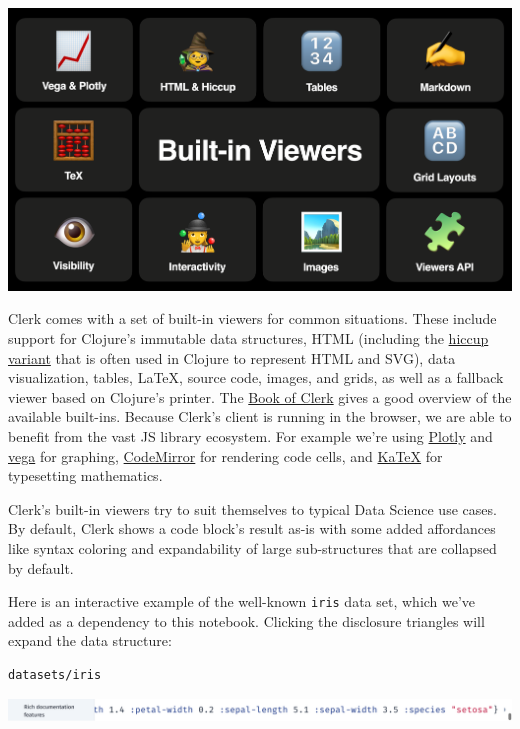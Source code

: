 \documentclass[sigconf,screen]{acmart}
\newcommand{\passthrough}[1]{#1}
\begin{document}
\includegraphics{images/built-in-viewers.png}

Clerk comes with a set of built-in viewers for common situations. These include support for Clojure's immutable data structures, HTML (including the \href{https://github.com/weavejester/hiccup}{hiccup variant} that is often used in Clojure to represent HTML and SVG), data visualization, tables, LaTeX, source code, images, and grids, as well as a fallback viewer based on Clojure's printer. The \href{https://book.clerk.vision}{Book of Clerk} gives a good overview of the available built-ins. Because Clerk's client is running in the browser, we are able to benefit from the vast JS library ecosystem. For example we're using \href{https://plotly.com/javascript/}{Plotly} and \href{https://github.com/vega/vega-embed}{vega} for graphing, \href{https://codemirror.net}{CodeMirror} for rendering code cells, and \href{https://katex.org}{KaTeX} for typesetting mathematics.

Clerk's built-in viewers try to suit themselves to typical Data Science use cases. By default, Clerk shows a code block's result as-is with some added affordances like syntax coloring and expandability of large sub-structures that are collapsed by default.

Here is an interactive example of the well-known \passthrough{\lstinline!iris!} data set, which we've added as a dependency to this notebook. Clicking the disclosure triangles will expand the data structure:

\begin{lstlisting}
datasets/iris
\end{lstlisting}

\includegraphics{images/result-anon-expr-5dtc44qrw3zUvpTfiAXJDH7mtADdRT.png}
\end{document}
